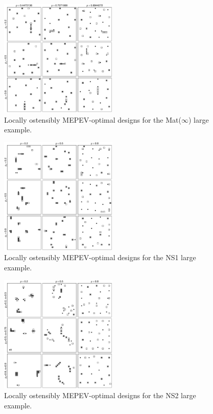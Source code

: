 \documentclass[12pt]{article}
\begin{document}
        \begin{figure}
        \begin{center}
        \includegraphics[width=0.5\textwidth]{saaeblup_matern1.pdf}
        \caption{Locally ostensibly MEPEV-optimal designs for the Mat($\infty$) large example.}\label{fig:mepevlarger}
        \end{center}
        \end{figure}

        \begin{figure}
        \begin{center}
        \includegraphics[width=0.5\textwidth]{saaeblup_NS2.pdf}
        \caption{Locally ostensibly MEPEV-optimal designs for the NS1 large example.}\label{fig:mepevlarger}
        \end{center}
        \end{figure}

        \begin{figure}
        \begin{center}
        \includegraphics[width=0.5\textwidth]{saaeblup_NS1.pdf}
        \caption{Locally ostensibly MEPEV-optimal designs for the NS2 large example.}\label{fig:mepevlarger}
        \end{center}
        \end{figure}
\end{document}
